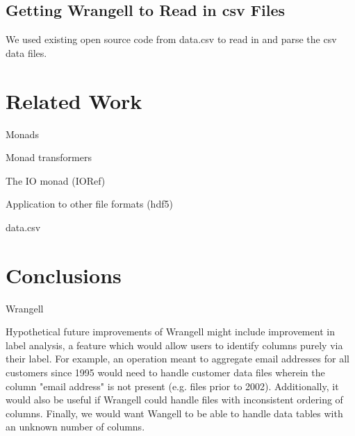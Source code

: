 \documentclass[preprint,nocopyrightspace]{sig-alternate}
\begin{document}
\subsection{Getting Wrangell to Read in csv Files}
We used existing open source code from data.csv \cite{dataCSV} to read in and parse the csv data files.


\section{Related Work}


Monads 

Monad transformers

The IO monad (IORef)

Application to other file formats (hdf5)

data.csv



\section{Conclusions}
Wrangell 


Hypothetical future improvements of Wrangell might include improvement in label analysis, a feature which would allow users to identify columns purely via their label. For example, an operation meant to aggregate email addresses for all customers since 1995 would need to handle customer data files wherein the column "email address" is not present (e.g. files prior to 2002). Additionally, it would also be useful if Wrangell could handle files with inconsistent ordering of columns. Finally, we would want Wangell to be able to handle data tables with an unknown number of columns. 




\end{document}
